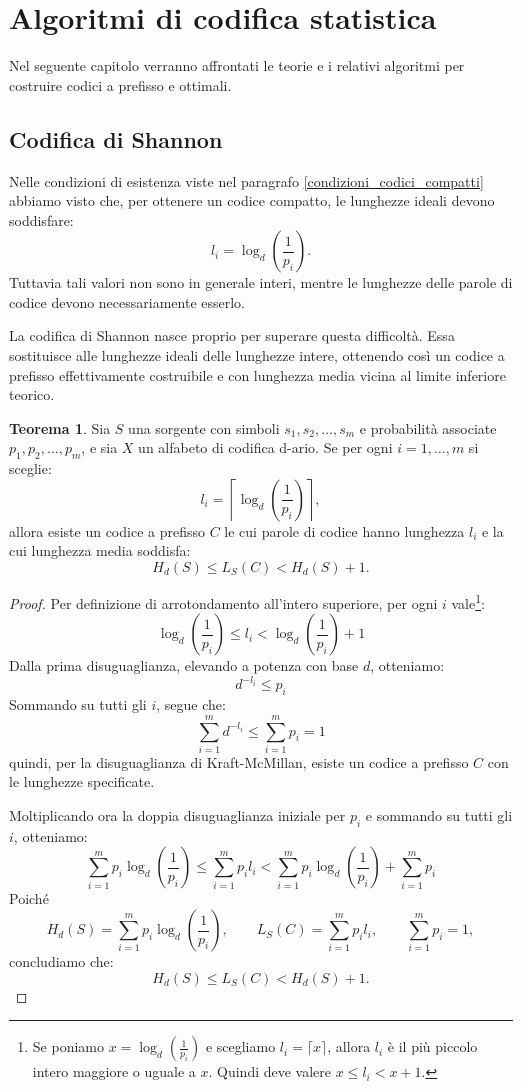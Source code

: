 \documentclass{article}
\theoremstyle{definition}
\newtheorem{theorem}{Teorema}[section] %
\numberwithin{equation}{section}
\begin{document}
\section{Algoritmi di codifica statistica}
Nel seguente capitolo verranno affrontati le teorie e i relativi algoritmi per costruire codici a prefisso e ottimali.

\subsection{Codifica di Shannon}
Nelle condizioni di esistenza viste nel paragrafo \eqref{condizioni_codici_compatti} abbiamo visto che, per ottenere un codice compatto, le lunghezze ideali devono soddisfare:
\[
    l_i = \log_d\!\left(\frac{1}{p_i}\right).
\]
Tuttavia tali valori non sono in generale interi, mentre le lunghezze delle parole di codice devono necessariamente esserlo.

La codifica di Shannon nasce proprio per superare questa difficoltà. Essa sostituisce alle lunghezze ideali delle lunghezze intere, ottenendo così un codice a prefisso effettivamente costruibile e con lunghezza media vicina al limite inferiore teorico.

\begin{theorem}\label{teorema_shannon_limite_sup_inf}
    Sia $S$ una sorgente con simboli $s_1, s_2, \ldots, s_m$ e probabilità associate $p_1, p_2, \ldots, p_m$, e sia $X$ un alfabeto di codifica d-ario. Se per ogni $i=1,\ldots,m$ si sceglie:
    \[
        l_i = \left\lceil \log_d\!\left(\frac{1}{p_i}\right) \right\rceil,
    \]
    allora esiste un codice a prefisso $C$ le cui parole di codice hanno lunghezza $l_i$ e la cui lunghezza media soddisfa:
    \[
        H_d(S) \leq L_S(C) < H_d(S) + 1.
    \]
\end{theorem}
\begin{proof}
    Per definizione di arrotondamento all'intero superiore, per ogni $i$ vale\footnote{Se poniamo $x=\log_d\!\left(\frac{1}{p_i}\right)$ e scegliamo $l_i=\lceil x \rceil$, allora $l_i$ è il più piccolo intero maggiore o uguale a $x$. Quindi deve valere $x \leq l_i < x+1$.}:
    \[
        \log_d\!\left(\frac{1}{p_i}\right) \leq l_i < \log_d\!\left(\frac{1}{p_i}\right)+1
    \]
    Dalla prima disuguaglianza, elevando a potenza con base $d$, otteniamo:
    \[
        d^{-l_i} \leq p_i
    \]
    Sommando su tutti gli $i$, segue che:
    \[
        \sum_{i=1}^m d^{-l_i} \leq \sum_{i=1}^m p_i = 1
    \]
    quindi, per la disuguaglianza di Kraft-McMillan, esiste un codice a prefisso $C$ con le lunghezze specificate.

    Moltiplicando ora la doppia disuguaglianza iniziale per $p_i$ e sommando su tutti gli $i$, otteniamo:
    \[
        \sum_{i=1}^m p_i \log_d\!\left(\frac{1}{p_i}\right)
        \leq
        \sum_{i=1}^m p_i l_i
        <
        \sum_{i=1}^m p_i \log_d\!\left(\frac{1}{p_i}\right) + \sum_{i=1}^m p_i
    \]
    Poiché
    \[
        H_d(S)=\sum_{i=1}^m p_i \log_d\!\left(\frac{1}{p_i}\right),
        \qquad
        L_S(C)=\sum_{i=1}^m p_i l_i,
        \qquad
        \sum_{i=1}^m p_i = 1,
    \]
    concludiamo che:
    \[
        H_d(S) \leq L_S(C) < H_d(S) + 1.
    \]
\end{proof}
\end{document}
